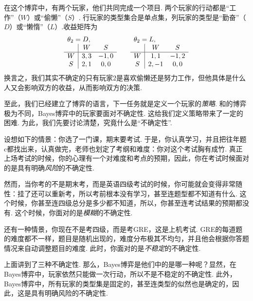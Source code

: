 \begin{example}[“工作还是偷懒”博弈]
    在这个博弈中，有两个玩家，他们共同完成一个项目. 两个玩家的行动都是“工作”（$W$）或“偷懒”（$S$）. 行玩家的类型集合是单点集，列玩家的类型是“勤奋”（$D$）或“懒惰”（$L$）.收益矩阵为
    \[\begin{array}{c|cc}
        \multicolumn{3}{l}{\theta_2=D,}\\
         &W&S  \\\hline
         W&3,3&-1,0\\
         S&2,1&0,0\\
    \end{array}\qquad \begin{array}{c|cc}
        \multicolumn{3}{l}{\theta_2=L,}\\
         &W&S  \\\hline
         W&1,1&-1,2\\
         S&2,-1&0,0\\
    \end{array}\]
    换言之，我们其实不确定的只有玩家$2$是喜欢偷懒还是努力工作，但他具体是什么人又会影响双方的收益，从而影响双方的决策. 
\end{example}

至此，我们已经建立了博弈的语言，下一任务就是定义一个玩家的\textit{策略}. 和的博弈极为不同，Bayes博弈中的玩家要面对不确定性. 这给我们定义策略带来了一定的困难. 为此，我们先要讨论清楚，究竟什么是“不确定性”. 

设想如下的情景：你选了一门课，期末要考试. 于是，你认真学习，并且把往年题c都找出来，认真做完，老师也划定了考纲和难度：你对这个考试胸有成竹. 真正上场考试的时候，你的心理有一个对难度和考点的预期，因此，你在考试时候面对的是具有明确\textit{风险}的不确定性. 

然而，当你考的不是期末考，而是英语四级考试的时候，你可能就会变得非常随性：挂了还可以重新考，所以考前根本没有学习，甚至连题型都不知道有什么. 这个时候，你甚至连四级总分是多少都不知道，所以，你甚至连考试结果的预期都没有. 这个时候，你面对的是\textit{模糊}的不确定性. 

还有一种情景，你现在不是考四级，而是考GRE，这是上机考试. GRE的每道题的难度都不一样，题目是随机出现的，难度分布极其不均匀，并且他会根据你答题情况来自动调整题目的难度. 此时，你面对的是\textit{不稳定}的不确定性. 

上面讲到了三种不确定性. 那么，Bayes博弈是他们中的是哪一种呢？显然，在Bayes博弈中，玩家依然只能做一次行动，所以不是不稳定的不确定性. 此外，Bayes博弈中，所有玩家的类型集是固定的，甚至连类型的似然也是确定的，因此，这是具有明确风险的不确定性. 

